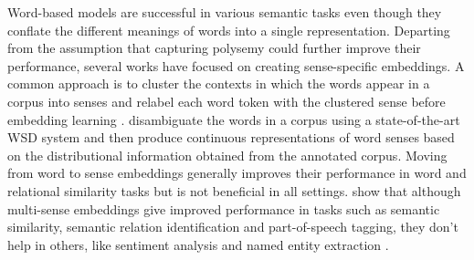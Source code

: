 \documentclass[11pt]{article}
\begin{document}
Word-based models are   successful in various semantic tasks even though they conflate the different meanings of words into a single representation. Departing from the assumption that capturing polysemy %
could further improve their performance, several works have focused on creating sense-specific embeddings. %
A common approach is to cluster the contexts in which the words appear in a corpus into senses %
and relabel each word token with the clustered sense before embedding learning  \cite{reisinger-mooney:2010:NAACLHLT,huang-EtAl:2012:ACL20122}. %
 disambiguate the words in a corpus using a state-of-the-art WSD system and then produce continuous representations of word senses based on the distributional information obtained from the annotated corpus. %
Moving from word to sense embeddings generally improves their performance in word and relational similarity tasks but is not beneficial in all settings. 
 show that although multi-sense embeddings give improved performance in tasks such as semantic similarity, semantic relation identification and part-of-speech tagging, they don't help in others, like sentiment analysis and named entity extraction \cite{li-jurafsky:2015:EMNLP}. %
\end{document}
